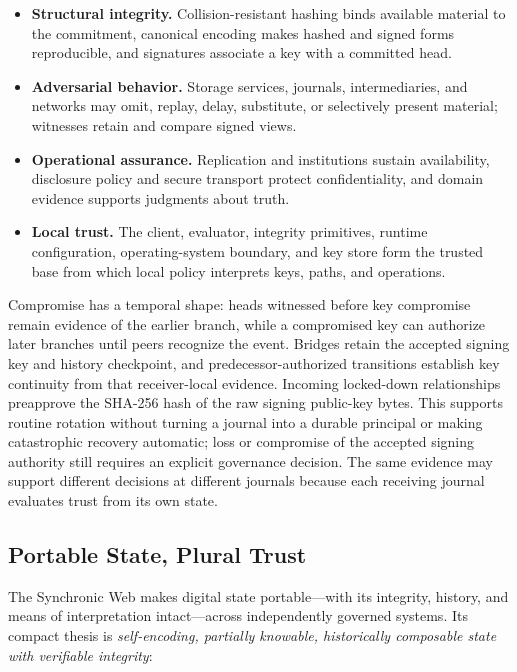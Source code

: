 \begin{itemize}
  \item \textbf{Structural integrity.} Collision-resistant hashing binds available material to the commitment, canonical encoding makes hashed and signed forms reproducible, and signatures associate a key with a committed head.
  \item \textbf{Adversarial behavior.} Storage services, journals, intermediaries, and networks may omit, replay, delay, substitute, or selectively present material; witnesses retain and compare signed views.
  \item \textbf{Operational assurance.} Replication and institutions sustain availability, disclosure policy and secure transport protect confidentiality, and domain evidence supports judgments about truth.
  \item \textbf{Local trust.} The client, evaluator, integrity primitives, runtime configuration, operating-system boundary, and key store form the trusted base from which local policy interprets keys, paths, and operations.
\end{itemize}

Compromise has a temporal shape: heads witnessed before key compromise remain evidence of the earlier branch, while a compromised key can authorize later branches until peers recognize the event. Bridges retain the accepted signing key and history checkpoint, and predecessor-authorized transitions establish key continuity from that receiver-local evidence. Incoming locked-down relationships preapprove the SHA-256 hash of the raw signing public-key bytes. This supports routine rotation without turning a journal into a durable principal or making catastrophic recovery automatic; loss or compromise of the accepted signing authority still requires an explicit governance decision. The same evidence may support different decisions at different journals because each receiving journal evaluates trust from its own state.

\subsection{Portable State, Plural Trust}

The Synchronic Web makes digital state portable---with its integrity, history, and means of interpretation intact---across independently governed systems. Its compact thesis is \emph{self-encoding, partially knowable, historically composable state with verifiable integrity}:

